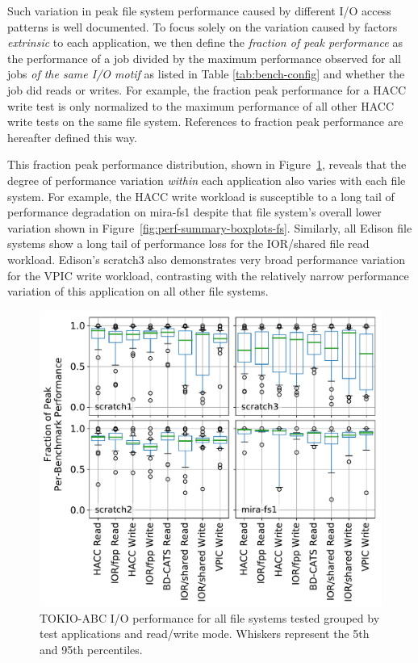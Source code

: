 Such variation in peak file system performance caused by different I/O access patterns is well documented\cite{Lofstead2010,Uselton2010,Xie2012}.
To focus solely on the variation caused by factors \emph{extrinsic} to each application, we then define the \emph{fraction of peak performance} as the performance of a job divided by the maximum performance observed for all jobs \emph{of the same I/O motif} as listed in Table \ref{tab:bench-config} and whether the job did reads or writes.
For example, the fraction peak performance for a HACC write test is only normalized to the maximum performance of all other HACC write tests on the same file system.
References to fraction peak performance are hereafter defined this way.

This fraction peak performance distribution, shown in Figure~\ref{fig:perf-summary-boxplots-motif}, reveals that the degree of performance variation \emph{within} each application also varies with each file system.
For example, the HACC write workload is susceptible to a long tail of performance degradation on mira-fs1 despite that file system's overall lower variation shown in Figure~\ref{fig:perf-summary-boxplots-fs}.
Similarly, all Edison file systems show a long tail of performance loss for the IOR/shared file read workload.
Edison's scratch3 also demonstrates very broad performance variation for the VPIC write workload, contrasting with the relatively narrow performance variation of this application on all other file systems.

\begin{figure}[t]
    \centering
    \includegraphics[width=1.0\columnwidth]{figs/perf-boxplots.pdf}
    \caption{TOKIO-ABC I/O performance for all file systems tested grouped by test
    applications and read/write mode.  Whiskers represent the 5th and 95th
    percentiles.}
    \label{fig:perf-summary-boxplots-motif}
\end{figure}

